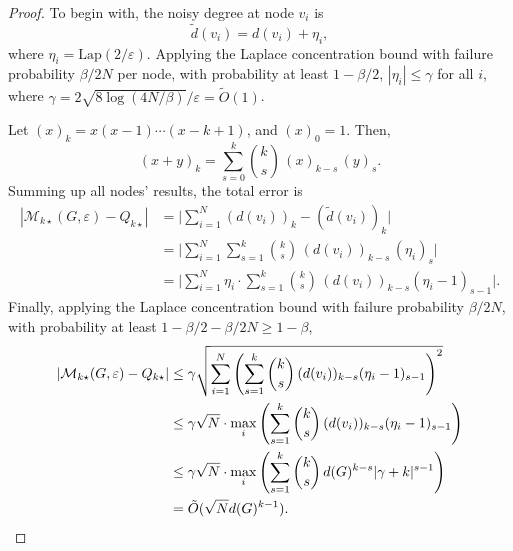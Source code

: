 \begin{proof}
To begin with, the noisy degree at node $v_i$ is
\begin{equation*}
    \tilde{d}(v_i) = d(v_i) + \eta_i, 
\end{equation*}
where $\eta_i = \mathrm{Lap}(2/\varepsilon)$.
Applying the Laplace concentration bound with failure probability $\beta/2N$ per node, with probability at least $1 - \beta/2$, 
$ | \eta_i | \leq \gamma$ for all $i$, where $\gamma = 2\sqrt{8\log(4N/\beta)}/{\varepsilon} = \tilde{O}(1) $. 

Let $(x)_k = x(x-1)\cdots(x-k+1)$, and $(x)_0 = 1$. 
Then,
\begin{equation*}
(x+y)_{k}=\sum_{s=0}^{k} \binom{k}{s}\,(x)_{k-s}\,(y)_{s}. 
\end{equation*}
Summing up all nodes' results, the total error is 
\begin{align*}
|\mathcal{M}_{k\star}(G, \varepsilon) - Q_{k\star }| &= \bigg| \sum_{i=1}^N (d(v_i))_k - (\tilde{d}(v_i))_k \bigg| \\
& = \bigg|\sum_{i=1}^N\sum_{s=1}^{k} \binom{k}{s}\,(d(v_i))_{k-s}\,(\eta_i)_{s} \bigg| \\
& = \bigg| \sum_{i=1}^N 
\eta_i
\cdot 
\sum_{s=1}^{k} \binom{k}{s}\,(d(v_i))_{k-s}(\eta_i-1)_{s-1} 
\bigg|.
\end{align*}
Finally, applying the Laplace concentration bound with failure probability $\beta/2N$, with probability at least $1- \beta/2 - \beta/2N \geq 1-\beta$,
\begin{align*}
    |\mathcal{M}_{k\star}(G, \varepsilon) - Q_{k\star }| 
    &\leq \gamma \sqrt{
    \sum_{i=1}^N
    \left(
    \sum_{s=1}^{k} \binom{k}{s}\,(d(v_i))_{k-s}(\eta_i-1)_{s-1}
    \right)^2 } \\
    &\leq \gamma \sqrt{N} \cdot \max_i 
    \left(
    \sum_{s=1}^{k} \binom{k}{s}\,(d(v_i))_{k-s}(\eta_i-1)_{s-1}
    \right) \\
    &\leq \gamma \sqrt{N} \cdot \max_i 
    \left(
    \sum_{s=1}^{k} \binom{k}{s}\,d(G)^{k-s}|\gamma+k|^{s-1}
    \right) \\
    &= \tilde{O}(\sqrt{N} d(G)^{k-1}). \qedhere
\end{align*}
\end{proof}


